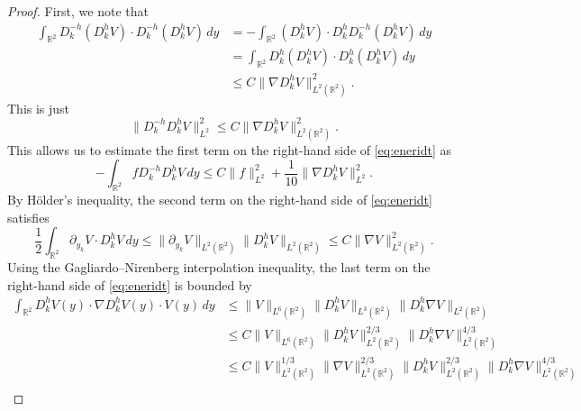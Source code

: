 \documentclass[12pt]{amsart}
\numberwithin{equation}{section}              %
\theoremstyle{remark}
\begin{document}
\begin{proof}
			First, we note that
			\begin{equation*}
				\begin{aligned}
					\int_{\mathbb{R}^{2}} D_{k}^{-h}(D_{k}^{h}V) \cdot D_{k}^{-h}(D_{k}^{h}V) \, dy &=
					-\int_{\mathbb{R}^{2}} (D_{k}^{h}V) \cdot D_{k}^{h}D_{k}^{-h}(D_{k}^{h}V) \, dy \\
					&=
					\int_{\mathbb{R}^{2}} D_{k}^{h}(D_{k}^{h}V) \cdot D_{k}^{h}(D_{k}^{h}V) \, dy \\
					&\leq C \|\nabla D_{k}^{h}V\|_{L^{2}(\mathbb{R}^{2})}^{2}.
				\end{aligned}
			\end{equation*}
			This is just
			\begin{equation*}
				\|D_{k}^{-h}D_{k}^{h}V\|_{L^2}^2 \leq C \|\nabla D_{k}^{h}V\|_{L^{2}(\mathbb{R}^{2})}^{2}.
			\end{equation*}
			This allows us to estimate the first term on the right-hand side of \eqref{eq:eneridt} as
			\begin{equation*}
				-\int_{\mathbb{R}^{2}} f D_{k}^{-h}D_{k}^{h}V \, dy \leq C \|f\|_{L^{2}}^2 + \frac{1}{10} \|\nabla D_{k}^{h}V\|_{L^{2}}^2.
			\end{equation*}
			By Hölder's inequality, the second term on the right-hand side of \eqref{eq:eneridt}  satisfies
			\begin{equation*}
				\frac{1}{2} \int_{\mathbb{R}^{2}} \partial_{y_{k}}V \cdot D_{k}^{h}V \, dy \leq \|\partial_{y_{k}}V\|_{L^{2}(\mathbb{R}^{2})} \|D_{k}^{h}V\|_{L^{2}(\mathbb{R}^{2})} \leq C \|\nabla V\|_{L^{2}(\mathbb{R}^{2})}^{2}.
			\end{equation*}
			Using the Gagliardo–Nirenberg  interpolation inequality, the last term on the right-hand side of \eqref{eq:eneridt} is bounded by
			\begin{equation*}
				\begin{aligned}
					\int_{\mathbb{R}^{2}} D_{k}^{h}V(y) \cdot \nabla D_{k}^{h} V(y) \cdot V(y) \, dy &\leq \|V\|_{L^{6}(\mathbb{R}^{2})} \|D_{k}^{h}V\|_{L^{3}(\mathbb{R}^{2})} \|D_{k}^{h}\nabla V\|_{L^{2}(\mathbb{R}^{2})} \\
					&\leq C \|V\|_{L^{6}(\mathbb{R}^{2})} \|D_{k}^{h}V\|_{L^{2}(\mathbb{R}^{2})}^{2/3} \|D_{k}^{h}\nabla V\|_{L^{2}(\mathbb{R}^{2})}^{4/3} \\
					&\leq C \|V\|_{L^{2}(\mathbb{R}^{2})}^{1/3} \|\nabla V\|_{L^{2}(\mathbb{R}^{2})}^{2/3} \|D_{k}^{h}V\|_{L^{2}(\mathbb{R}^{2})}^{2/3} \|D_{k}^{h}\nabla V\|_{L^{2}(\mathbb{R}^{2})}^{4/3} \\

\end{aligned}
\end{equation*}
\end{proof}
\end{document}
